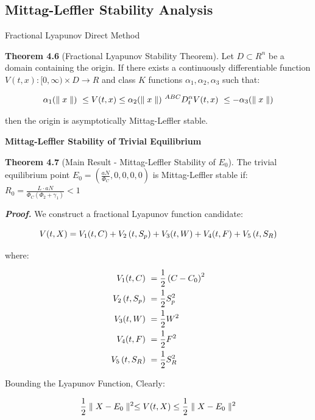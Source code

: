 \documentclass[10pt]{NSP1}
\newcommand{\fitwidth}[1]{\resizebox{\ifdim\width>\linewidth\linewidth\else\width\fi}{!}{#1}}
\begin{document}
\subsection{Mittag-Leffler Stability Analysis}

Fractional Lyapunov Direct Method

\textbf{Theorem 4.6} (Fractional Lyapunov Stability Theorem). Let \(D \subset R^{n}\) be a domain containing the origin. If there exists a continuously differentiable function \(V(t,x):\lbrack 0,\infty) \times D \rightarrow R\) and class \(K\) functions \(\alpha_{1},\alpha_{2},\alpha_{3}\) such that:

\[
\fitwidth{$\displaystyle \alpha_{1}( \parallel x \parallel )\  \leq V(t,x) \leq \alpha_{2}( \parallel x \parallel )\ ^{ABC}D_{t}^{\alpha}V(t,x)\  \leq - \alpha_{3}( \parallel x \parallel ){}$}
\]

then the origin is asymptotically Mittag-Leffler stable.

\textbf{Mittag-Leffler Stability of Trivial Equilibrium}

\textbf{Theorem 4.7} (Main Result - Mittag-Leffler Stability of \(E_{0}\)). The trivial equilibrium point \(E_{0} = \left( \frac{aN}{\Phi_{C}},0,0,0,0 \right)\) is Mittag-Leffler stable if: \(R_{0} = \frac{L \cdot aN}{\Phi_{C}\left( \Phi_{2} + \gamma_{1} \right)} < 1\)

\emph{\textbf{Proof.}} We construct a fractional Lyapunov function candidate:

\[
\fitwidth{$\displaystyle V(t,X) = V_{1}(t,C) + V_{2}\left( t,S_{p} \right) + V_{3}(t,W) + V_{4}(t,F) + V_{5}\left( t,S_{R} \right)$}
\]

where:

\[
\fitwidth{$\displaystyle \begin{aligned}
V_{1}(t,C)\ &= \frac{1}{2}\left( C - C_{0} \right)^{2} \\
V_{2}\left( t,S_{p} \right)\ &= \frac{1}{2}S_{p}^{2} \\
V_{3}(t,W)\ &= \frac{1}{2}W^{2} \\
V_{4}(t,F)\ &= \frac{1}{2}F^{2} \\
V_{5}\left( t,S_{R} \right)\ &= \frac{1}{2}S_{R}^{2}\
\end{aligned}$}
\]

Bounding the Lyapunov Function, Clearly:

\[
\fitwidth{$\displaystyle \frac{1}{2} \parallel X - E_{0} \parallel^{2} \leq V(t,X) \leq \frac{1}{2} \parallel X - E_{0} \parallel^{2}$}
\]
\end{document}
